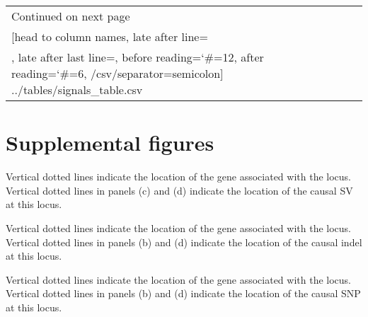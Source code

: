 \begin{landscape}
\begin{ThreePartTable}
\begin{longtable}{llcclcccl}
			\bottomrule
			Continued on next page \\
			\endfoot

			\bottomrule \insertTableNotes
			\endlastfoot
			\csvreader[head to column names,
			late after line=\\,
			late after last line=,
			before reading={\catcode`\#=12},
			after reading={\catcode`\#=6},
			/csv/separator=semicolon]%
			{../tables/signals_table.csv}{}{\Trait & \Locus & \Chromosome & \Pvalues & \Gene & \Platypus & \Paragraph & \Kmers & \Study}

		\end{longtable}

	\end{ThreePartTable}

\end{landscape}
\clearpage

\section*{Supplemental figures}
\label{annexe-sv-gwas-figures}

%
{Vertical dotted lines indicate the location of the  gene associated with the locus.}
%
{Vertical dotted lines in panels (c) and (d) indicate the location of the causal SV at this locus.}

%
{Vertical dotted lines indicate the location of the  gene associated with the locus.}
%
{Vertical dotted lines in panels (b) and (d) indicate the location of the causal indel at this locus.}

%
{Vertical dotted lines indicate the location of the  gene associated with the locus.}
%
{Vertical dotted lines in panels (b) and (d) indicate the location of the causal SNP at this locus.}

